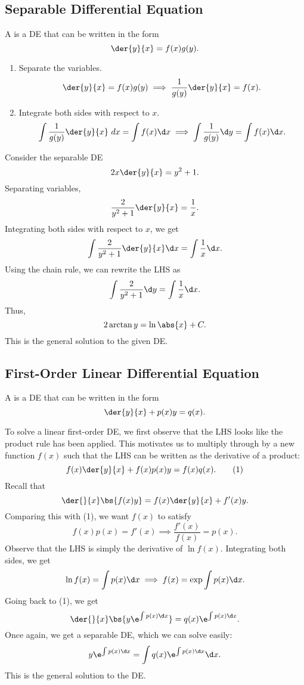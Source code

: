 \subsection{Separable Differential Equation}

\begin{definition}
    A  is a DE that can be written in the form \[\der{y}{x} = f(x) g(y).\]
\end{definition}

\begin{recipe}
    \phantom{.}
    \renewcommand{\theenumi}{\arabic{enumi}.}%
    \begin{enumerate}
        \item Separate the variables. \[\der{y}{x} = f(x) g(y) \implies \frac1{g(y)} \der{y}{x} = f(x).\]
        \item Integrate both sides with respect to $x$. \[\int \frac1{g(y)} \der{y}{x} \ d x = \int f(x) \d x \implies \int \frac1{g(y)} \d y = \int f(x) \d x.\]
    \end{enumerate}
    \renewcommand{\theenumi}{(\alph{enumi})}
\end{recipe}

\begin{example}
    Consider the separable DE \[2x \der{y}{x} = y^2 + 1.\] Separating variables, \[\frac2{y^2 + 1} \der{y}{x} = \frac1{x}.\] Integrating both sides with respect to $x$, we get \[\int \frac2{y^2 + 1} \der{y}{x} \d x = \int \frac1{x} \d x.\] Using the chain rule, we can rewrite the LHS as \[\int \frac2{y^2 + 1} \d y = \int \frac1{x} \d x.\] Thus, \[2\arctan y = \ln \abs{x} + C.\] This is the general solution to the given DE.
\end{example}

\subsection{First-Order Linear Differential Equation}

\begin{definition}
    A  is a DE that can be written in the form \[\der{y}{x} + p(x) y = q(x).\]
\end{definition}

To solve a linear first-order DE, we first observe that the LHS looks like the product rule has been applied. This motivates us to multiply through by a new function $f(x)$ such that the LHS can be written as the derivative of a product: \[f(x) \der{y}{x} + f(x) p(x) y = f(x) q(x). \tag{1}\] Recall that \[\der{}{x} \bs{f(x) y} = f(x) \der{y}{x} + f'(x) y.\] Comparing this with (1), we want $f(x)$ to satisfy \[f(x) p(x) = f'(x) \implies \frac{f'(x)}{f(x)} = p(x).\] Observe that the LHS is simply the derivative of $\ln f(x)$. Integrating both sides, we get \[\ln f(x) = \int p(x) \d x \implies f(x) = \exp \int p(x) \d x.\] Going back to (1), we get \[\der{}{x} \bs{y \e^{\int p(x) \d x}} = q(x) \e^{\int p(x) \d x}.\] Once again, we get a separable DE, which we can solve easily: \[y \e^{\int p(x) \d x} = \int q(x) \e^{\int p(x) \d x} \d x.\] This is the general solution to the DE.

